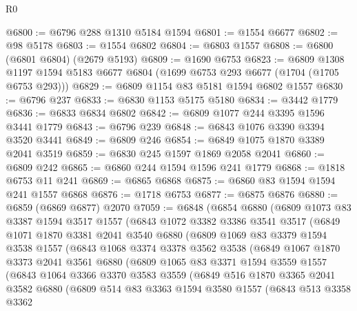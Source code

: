 \begin{lexlean}{R0}
\begin{coremodule}
@6800 := @6796 @288 @1310 @5184 @1594
@6801 := @1554 @6677
@6802 := @98 @5178
@6803 := @1554 @6802
@6804 := @6803 @1557
@6808 := @6800 (@6801 @6804) (@2679 @5193)
@6809 := @1690 @6753
@6823 := @6809
    @1308
    @1197
    @1594
    @5183
    @6677
    @6804
    (@1699 @6753 @293 @6677 (@1704 (@1705 @6753 @293)))
@6829 := @6809 @1154 @83 @5181 @1594 @6802 @1557
@6830 := @6796 @237
@6833 := @6830 @1153 @5175 @5180
@6834 := @3442 @1779
@6836 := @6833 @6834 @6802
@6842 := @6809 @1077 @244 @3395 @1596 @3441 @1779
@6843 := @6796 @239
@6848 := @6843 @1076 @3390 @3394 @3520 @3441
@6849 := @6809 @246
@6854 := @6849 @1075 @1870 @3389 @2041 @3519
@6859 := @6830 @245 @1597 @1869 @2058 @2041
@6860 := @6809 @242
@6865 := @6860 @244 @1594 @1596 @241 @1779
@6868 := @1818 @6753 @11 @241
@6869 := @6865 @6868
@6875 := @6860 @83 @1594 @1594 @241 @1557 @6868
@6876 := @1718 @6753
@6877 := @6875 @6876
@6880 := @6859 (@6869 @6877) @2070
@7059 := @6848
    (@6854
      @6880
      (@6809
        @1073
        @83
        @3387
        @1594
        @3517
        @1557
        (@6843
          @1072
          @3382
          @3386
          @3541
          @3517
          (@6849
            @1071
            @1870
            @3381
            @2041
            @3540
            @6880
            (@6809
              @1069
              @83
              @3379
              @1594
              @3538
              @1557
              (@6843
                @1068
                @3374
                @3378
                @3562
                @3538
                (@6849
                  @1067
                  @1870
                  @3373
                  @2041
                  @3561
                  @6880
                  (@6809
                    @1065
                    @83
                    @3371
                    @1594
                    @3559
                    @1557
                    (@6843
                      @1064
                      @3366
                      @3370
                      @3583
                      @3559
                      (@6849
                        @516
                        @1870
                        @3365
                        @2041
                        @3582
                        @6880
                        (@6809
                          @514
                          @83
                          @3363
                          @1594
                          @3580
                          @1557
                          (@6843
                            @513
                            @3358
                            @3362

\end{coremodule}
\end{lexlean}

